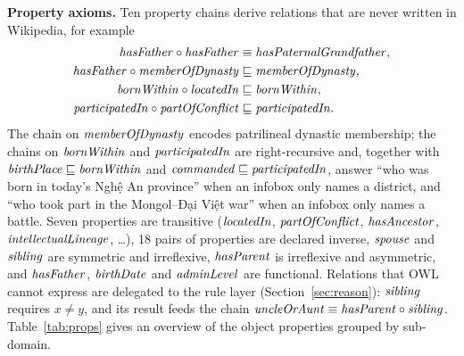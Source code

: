 \documentclass{article}
\newcommand{\cls}[1]{\ensuremath{\text{\textit{#1}}}}  %
\begin{document}
\textbf{Property axioms.} Ten property chains derive relations that are never written in Wikipedia, for example
\begin{align}
  \cls{hasFather} \circ \cls{hasFather} &\equiv \cls{hasPaternalGrandfather}, \\
  \cls{hasFather} \circ \cls{memberOfDynasty} &\sqsubseteq \cls{memberOfDynasty}, \\
  \cls{bornWithin} \circ \cls{locatedIn} &\sqsubseteq \cls{bornWithin}, \\
  \cls{participatedIn} \circ \cls{partOfConflict} &\sqsubseteq \cls{participatedIn}.
\end{align}
The chain on \cls{memberOfDynasty} encodes patrilineal dynastic membership; the chains on \cls{bornWithin} and
\cls{participatedIn} are right-recursive and, together with
$\cls{birthPlace} \sqsubseteq \cls{bornWithin}$ and $\cls{commanded} \sqsubseteq \cls{participatedIn}$, answer ``who was
born in today's Nghệ An province'' when an infobox only names a district, and ``who took part in the Mongol--Đại Việt
war'' when an infobox only names a battle. Seven properties are transitive (\cls{locatedIn}, \cls{partOfConflict},
\cls{hasAncestor}, \cls{intellectualLineage}, \ldots), 18 pairs of properties are declared inverse, \cls{spouse} and
\cls{sibling} are symmetric and irreflexive, \cls{hasParent} is irreflexive and asymmetric, and \cls{hasFather},
\cls{birthDate} and \cls{adminLevel} are functional. Relations that OWL cannot express are delegated to the rule layer
(Section~\ref{sec:reason}): \cls{sibling} requires $x \neq y$, and its result feeds the chain
$\cls{uncleOrAunt} \equiv \cls{hasParent} \circ \cls{sibling}$. Table~\ref{tab:props} gives an overview of the object
properties grouped by sub-domain.
\end{document}
